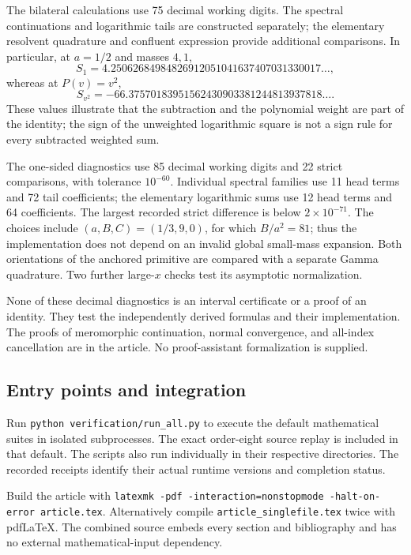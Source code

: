 \documentclass[11pt,a4paper]{article}
\numberwithin{equation}{section}
\theoremstyle{plain}
\theoremstyle{definition}
\theoremstyle{remark}
\newcommand{\src}[1]{\nolinkurl{#1}}
\begin{document}
The bilateral calculations use 75 decimal working digits.  The
spectral continuations and logarithmic tails are constructed separately;
the elementary resolvent quadrature and confluent expression provide
additional comparisons.  In particular, at $a=1/2$ and masses $4,1$,
\[
 S_1=4.25062684984826912051041637407031330017\ldots,
\]
whereas at $P(v)=v^2$,
\[
 S_{v^2}=-66.37570183951562430903381244813937818\ldots.
\]
These values illustrate that the subtraction and the polynomial weight
are part of the identity; the sign of the unweighted logarithmic square
is not a sign rule for every subtracted weighted sum.

The one-sided diagnostics use 85 decimal working digits and 22 strict
comparisons, with tolerance $10^{-60}$.  Individual spectral families
use 11 head terms and 72 tail coefficients; the elementary logarithmic
sums use 12 head terms and 64 coefficients.  The largest recorded
strict difference is below $2\times10^{-71}$.  The choices include
$(a,B,C)=(1/3,9,0)$, for which $B/a^2=81$; thus the implementation
does not depend on an invalid global small-mass expansion.  Both
orientations of the anchored primitive are compared with a separate
Gamma quadrature.  Two further large-$x$ checks test its asymptotic
normalization.

None of these decimal diagnostics is an interval certificate or a proof
of an identity.  They test the independently derived formulas and
their implementation.  The proofs of meromorphic continuation,
normal convergence, and all-index cancellation are in the article.
No proof-assistant formalization is supplied.

\subsection{Entry points and integration}

Run \src{python verification/run_all.py} to execute the default
mathematical suites in isolated subprocesses.  The exact order-eight
source replay is included in that default.  The scripts also run
individually in their respective directories.  The recorded receipts
identify their actual runtime versions and completion status.

Build the article with
\src{latexmk -pdf -interaction=nonstopmode -halt-on-error article.tex}.
Alternatively compile \src{article_singlefile.tex} twice with
pdf\LaTeX{}.  The combined source embeds every section and bibliography
and has no external mathematical-input dependency.
\end{document}
